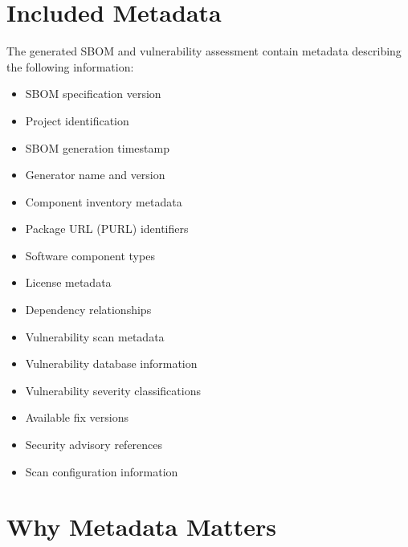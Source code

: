 \vspace{0.4cm}


\section{Included Metadata}

The generated SBOM and vulnerability assessment contain metadata describing the following information:
\begin{itemize}
\item SBOM specification version
\item Project identification
\item SBOM generation timestamp
\item Generator name and version
\item Component inventory metadata
\item Package URL (PURL) identifiers
\item Software component types
\item License metadata
\item Dependency relationships
\item Vulnerability scan metadata
\item Vulnerability database information
\item Vulnerability severity classifications
\item Available fix versions
\item Security advisory references
\item Scan configuration information
\end{itemize}

\vspace{0.4cm}


\section{Why Metadata Matters}

